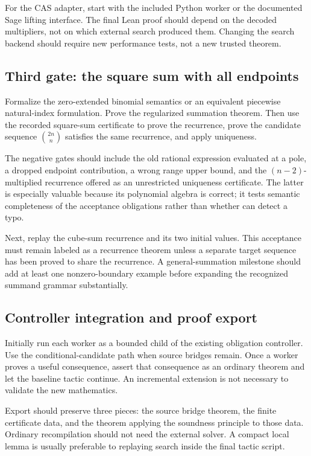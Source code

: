 For the CAS adapter, start with the included Python worker or the documented
Sage lifting interface. The final Lean proof should depend on the decoded
multipliers, not on which external search produced them. Changing the search
backend should require new performance tests, not a new trusted theorem.

\subsection{Third gate: the square sum with all endpoints}

Formalize the zero-extended binomial semantics or an equivalent piecewise
natural-index formulation. Prove the regularized summation theorem. Then use
the recorded square-sum certificate to prove the recurrence, prove the
candidate sequence $\binom{2n}{n}$ satisfies the same recurrence, and apply
uniqueness.

The negative gates should include the old rational expression evaluated at a
pole, a dropped endpoint contribution, a wrong range upper bound, and the
$(n-2)$-multiplied recurrence offered as an unrestricted uniqueness certificate.
The latter is especially valuable because its polynomial algebra is correct;
it tests semantic completeness of the acceptance obligations rather than
whether  can detect a typo.

Next, replay the cube-sum recurrence and its two initial values. This acceptance
must remain labeled as a recurrence theorem unless a separate target sequence
has been proved to share the recurrence. A general-summation milestone should
add at least one nonzero-boundary example before expanding the recognized
summand grammar substantially.

\subsection{Controller integration and proof export}

Initially run each worker as a bounded child of the existing obligation
controller. Use the conditional-candidate path when source bridges remain.
Once a worker proves a useful consequence, assert that consequence as an
ordinary theorem and let the baseline tactic continue. An incremental
\grind{} extension is not necessary to validate the new mathematics.

Export should preserve three pieces: the source bridge theorem, the finite
certificate data, and the theorem applying the soundness principle to those
data. Ordinary recompilation should not need the external solver. A compact
local lemma is usually preferable to replaying search inside the final tactic
script.

